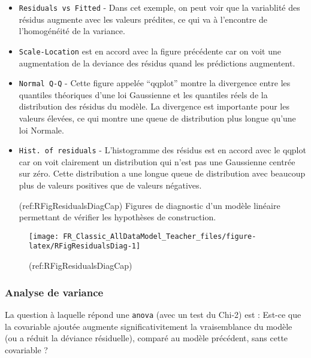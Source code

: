 \documentclass[french,a4paper]{article}
\begin{document}
\begin{itemize}
\item
  \texttt{Residuals\ vs\ Fitted} - Dans cet exemple, on peut voir que la variablité des résidus augmente avec les valeurs prédites, ce qui va à l'encontre de l'homogénéité de la variance.
\item
  \texttt{Scale-Location} est en accord avec la figure précédente car on voit une augmentation de la deviance des résidus quand les prédictions augmentent.
\item
  \texttt{Normal\ Q-Q} - Cette figure appelée ``qqplot'' montre la divergence entre les quantiles théoriques d'une loi Gaussienne et les quantiles réels de la distribution des résidus du modèle. La divergence est importante pour les valeurs élevées, ce qui montre une queue de distribution plus longue qu'une loi Normale.
\item
  \texttt{Hist.\ of\ residuals} - L'histogramme des résidus est en accord avec le qqplot car on voit clairement un distribution qui n'est pas une Gaussienne centrée sur zéro. Cette distribution a une longue queue de distribution avec beaucoup plus de valeurs positives que de valeurs négatives.

  (ref:RFigResidualsDiagCap) Figures de diagnostic d'un modèle linéaire permettant de vérifier les hypothèses de construction.
\end{itemize}

\begin{figure}[!h]

{\centering \texttt{[image: FR\_Classic\_AllDataModel\_Teacher\_files/figure-latex/RFigResidualsDiag-1]} 

}

\caption{(ref:RFigResidualsDiagCap)}\label{fig:RFigResidualsDiag}
\end{figure}

\hypertarget{analyse-de-variance}{%
\subsubsection{Analyse de variance}\label{analyse-de-variance}}

La question à laquelle répond une \texttt{anova} (avec un test du Chi-2) est : Est-ce que la covariable ajoutée augmente significativitement la vraisemblance du modèle (ou a réduit la déviance résiduelle), comparé au modèle précédent, sans cette covariable ?
\end{document}

